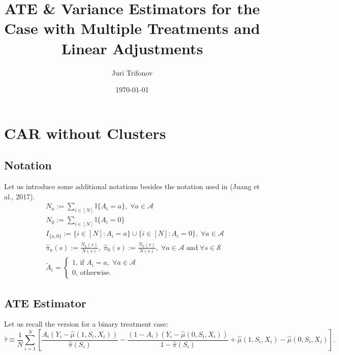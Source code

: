\documentclass{article}
\title{ATE \& Variance Estimators for the Case with Multiple Treatments and Linear Adjustments}
\author{Juri Trifonov}
\date{\today}
\begin{document}
\maketitle

\section{CAR without Clusters}
\subsection*{Notation}

Let us introduce some additional notations besides the notation used in (Juang et al., 2017).
\begin{align}
& N_a := \sum_{i \in[N]} \mathbb I\{A_i = a\},\;\forall a \in \mathcal{A}  \nonumber \\
& N_0 := \sum_{i \in[N]} \mathbb I\{A_i = 0\} \nonumber \\
& I_{\{a,0\}} := \{i \in[N]: A_i = a\} \cup \{i \in[N]: A_i = 0\}, \;\forall a \in \mathcal{A} \nonumber \\
& \hat{\pi}_a(s) := \frac{N_a(s)}{N(s)}, \; \hat{\pi}_0(s) := \frac{N_0(s)}{N(s)},\;\forall a \in \mathcal{A} \; \text{and} \; \forall s \in \mathcal S   \nonumber \\
& \tilde{A}_i = \begin{cases}1\text{, if }A_i = a, \; \forall a \in \mathcal{A} \\ 0\text{, otherwise.}\end{cases} \nonumber
\end{align}

\subsection*{ATE Estimator}

Let us recall the version for a binary treatment case:
\[\hat{\tau} \equiv \frac{1}{N} \sum_{i = 1}^{N} \left[ \frac{A_i (Y_i - \hat{\mu}(1, S_i, X_i))}{\hat{\pi}(S_i)} - \frac{(1 - A_i) (Y_i- \hat{\mu}(0,S_i,X_i))}{1 - \hat{\pi}(S_i)}  + \hat{\mu}(1, S_i, X_i) - \hat{\mu}(0, S_i, X_i)\right].\]
\end{document}
